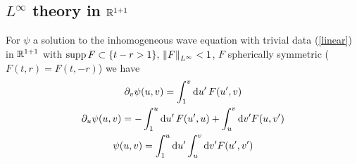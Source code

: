 \documentclass[11pt, oneside]{amsart}
\begin{document}
	\subsection{$L^\infty$ theory in $\mathbb{R}^{1+1}$}\label{l infinite theory}
	\begin{lemma}
		For $\psi$ a solution to the inhomogeneous wave equation with trivial data (\eqref{linear}) in $\mathbb{R}^{1+1}$ with $\operatorname{supp} F\subset\{t-r>1\},\, \left\lVert F\right\rVert_{L^\infty}<1$, $F$ spherically symmetric ($F(t,r)=F(t,-r)$) we have 
		\begin{equation*}
			\begin{gathered}
				\partial_v\psi(u,v)=\int_1^v\mathrm{d} u^\prime\, F(u^\prime,v)\\
				\partial_u\psi(u,v)=-\int_1^u\mathrm{d} u^\prime\, F(u^\prime,u)+\int_u^v\mathrm{d} v^\prime F(u,v^\prime)\\
				\psi(u,v)=\int_1^u\mathrm{d} u^\prime\int_u^v\mathrm{d} v^\prime  F(u^\prime,v^\prime)
			\end{gathered}
		\end{equation*}
	\end{lemma}
	
\end{document}

